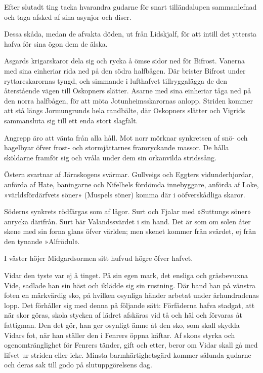 Efter slutadt ting tacka hvarandra gudarne för snart tilländalupen
sammanlefnad och taga afsked af sina asynjor och diser.

Dessa skåda, medan de afvakta döden, ut från Lidskjalf, för att intill
det yttersta hafva för sina ögon dem de älska.

Asgards krigarskaror dela sig och rycka å ömse sidor ned för Bifrost.
Vanerna med sina einheriar rida ned på den södra halfbågen. Där brister
Bifrost under ryttareskarornas tyngd, och simmande i lufthafvet
tillryggalägga de den återstående vägen till Oskopners slätter. Asarne
med sina einheriar tåga ned på den norra halfbågen, för att möta
Jotunheimsskarornas anlopp. Striden kommer att stå längs Jormungrunds
hela randbälte, där Oskopners slätter och Vigrids sammansluta sig till
ett enda stort slagfält.

Angrepp äro att vänta från alla håll. Mot norr mörknar synkretsen af
snö- och hagelbyar öfver frost- och stormjättarnes framryckande massor.
De hålla sköldarne framför sig och vråla under dem sin orkanvilda
stridssång.

Östern svartnar af Järnskogens svärmar. Gullveigs och Eggters
vidunderhjordar, anförda af Hate, baningarne och Nifelhels fördömda
innebyggare, anförda af Loke, »världsfördärfvets söner» (Muspels söner)
komma där i oöfverskådliga skaror.

Söderns synkrets rödfärgas som af lågor. Surt och Fjalar med »Suttungs
söner» anrycka därifrån. Surt bär Valandssvärdet i sin hand. Det är som
om solen åter skene med sin forna glans öfver världen; men skenet kommer
från svärdet, ej från den tynande »Alfrödul».

I väster höjer Midgardsormen sitt hufvud högre öfver hafvet.

Vidar den tyste var ej å tinget. På sin egen mark, det ensliga och
gräsbevuxna Vide, sadlade han sin häst och iklädde sig sin rustning. Där
band han på vänstra foten en märkvärdig sko, på hvilken osynliga händer
arbetat under århundradenas lopp. Det förhåller sig med denna på
följande sätt: Förfäderna hafva stadgat, att när skor göras,
skola stycken af lädret afskäras vid tå och häl och förvaras åt
fattigman. Den det gör, han ger osynligt ämne åt den sko, som skall
skydda Vidars fot, när han ställer den i Fenrers öppna käftar. Af skons
styrka och ogenomtränglighet för Fenrers tänder, gift och etter, beror
om Vidar skall gå med lifvet ur striden eller icke. Minsta
barmhärtighetsgärd kommer sålunda gudarne och deras sak till godo på
slutuppgörelsens dag.

